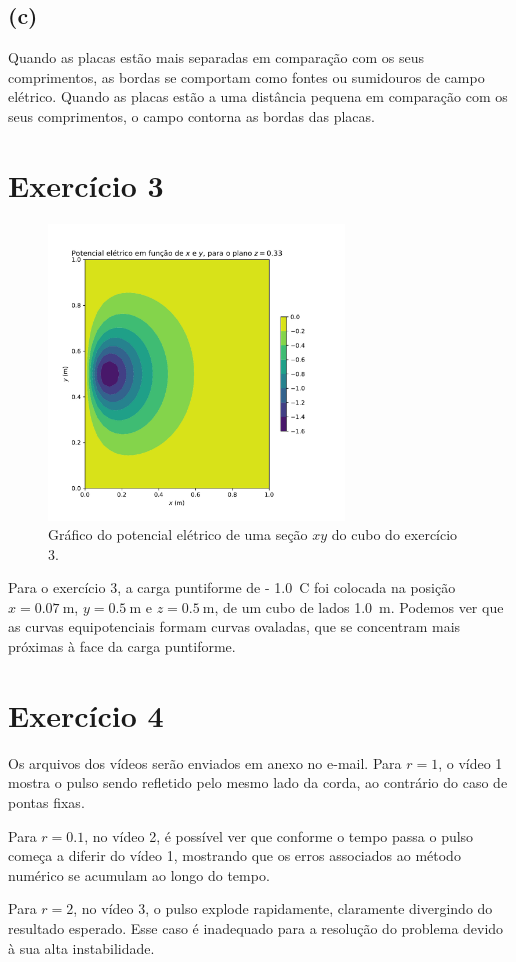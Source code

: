 \documentclass[a4paper, brazil]{article}
\begin{document}
\subsection{(c)}

Quando as placas estão mais separadas em comparação com os seus comprimentos, as bordas se comportam como fontes ou sumidouros de campo elétrico.
Quando as placas estão a uma distância pequena em comparação com os seus comprimentos, o campo contorna as bordas das placas.

\newpage
\section{Exercício 3}

\begin{figure}[ht]
\centering
\includegraphics[width=0.7\textwidth]{imagem3.pdf}
\caption{Gráfico do potencial elétrico de uma seção \( xy \) do cubo do exercício 3.}\label{fig3a}
\end{figure}

Para o exercício 3, a carga puntiforme de \SI{- 1.0}{\coulomb} foi colocada na posição \( x = \SI{0.07}{\meter} \), \( y = \SI{0.5}{\meter} \) e \( z = \SI{0.5}{\meter} \), de um cubo de lados \SI{1.0}{\meter}.
Podemos ver que as curvas equipotenciais formam curvas ovaladas, que se concentram mais próximas à face da carga puntiforme.

\section{Exercício 4}

Os arquivos dos vídeos serão enviados em anexo no e-mail.
Para \( r = 1 \), o vídeo 1 mostra o pulso sendo refletido pelo mesmo lado da corda, ao contrário do caso de pontas fixas.

Para \( r = 0.1 \), no vídeo 2, é possível ver que conforme o tempo passa o pulso começa a diferir do vídeo 1, mostrando que os erros associados ao método numérico se acumulam ao longo do tempo.

Para \( r = 2 \), no vídeo 3, o pulso explode rapidamente, claramente divergindo do resultado esperado.
Esse caso é inadequado para a resolução do problema devido à sua alta instabilidade.
\end{document}

